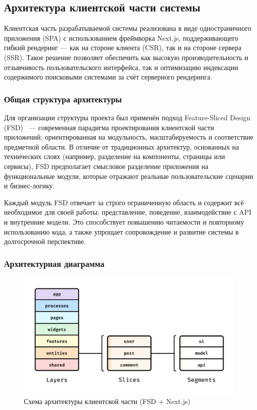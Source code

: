 \subsection{Архитектура клиентской части системы}

Клиентская часть разрабатываемой системы реализована в виде одностраничного приложения (SPA) с использованием фреймворка Next.js, поддерживающего гибкий рендеринг — как на стороне клиента (CSR), так и на стороне сервера (SSR). Такое решение позволяет обеспечить как высокую производительность и отзывчивость пользовательского интерфейса, так и оптимизацию индексации содержимого поисковыми системами за счёт серверного рендеринга.

\subsubsection{Общая структура архитектуры}

Для организации структуры проекта был применён подход Feature-Sliced Design (FSD)~\cite{feature_sliced_design} — современная парадигма проектирования клиентской части приложений, ориентированная на модульность, масштабируемость и соответствие предметной области. В отличие от традиционных архитектур, основанных на технических слоях (например, разделение на компоненты, страницы или сервисы), FSD предполагает смысловое разделение приложения на функциональные модули, которые отражают реальные пользовательские сценарии и бизнес-логику.

Каждый модуль FSD отвечает за строго ограниченную область и содержит всё необходимое для своей работы: представление, поведение, взаимодействие с API и внутренние модели. Это способствует повышению читаемости и повторному использованию кода, а также упрощает сопровождение и развитие системы в долгосрочной перспективе.

\subsubsection{Архитектурная диаграмма}

\begin{figure}[h]
  \centering
  \includegraphics[width=0.7\linewidth]{static/fsdImage}
  \caption{Схема архитектуры клиентской части (FSD + Next.js)}
\end{figure}

